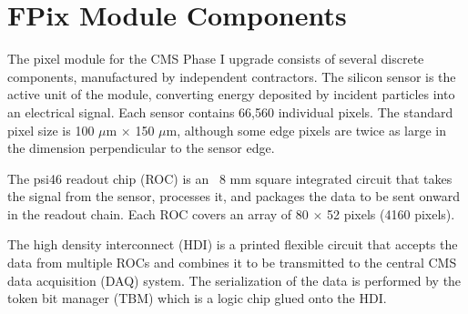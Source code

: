 \section{FPix Module Components}
\label{s:components}

The pixel module for the CMS Phase I upgrade consists of several discrete components, manufactured by independent contractors.  
The silicon sensor is the active unit of the module, converting energy deposited by incident particles into an electrical signal.  
Each sensor contains 66,560 individual pixels.  
The standard pixel size is 100 $\mu$m $\times$ 150 $\mu$m, although some edge pixels are twice as large in the dimension perpendicular to the sensor edge.  

The psi46 readout chip (ROC) is an ~8 mm square integrated circuit that takes the signal from the sensor, 
processes it, and packages the data to be sent onward in the readout chain.  
Each ROC covers an array of 80 $\times$ 52 pixels (4160 pixels).  

The high density interconnect (HDI) is a printed flexible circuit that accepts the data from multiple ROCs 
and combines it to be transmitted to the central CMS data acquisition (DAQ) system.  
The serialization of the data is performed by the token bit manager (TBM) which is a logic chip glued onto the HDI.
